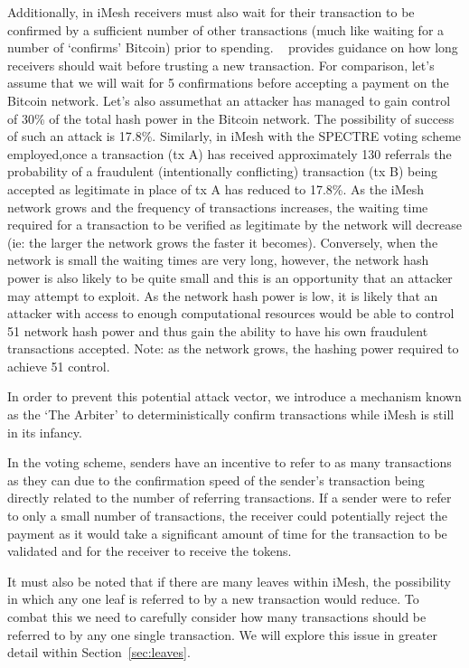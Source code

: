 \documentclass[a4paper,10pt,twocolumn]{article}
\begin{document}
 Additionally, in iMesh receivers must also wait for their transaction to be confirmed by a sufficient number of other transactions 
 (much like waiting for a number of `confirms' Bitcoin) prior to spending. ~\cite{spectre} provides guidance on how long receivers 
 should wait before trusting a new transaction. For comparison, let's assume that we will wait for 5 confirmations before accepting a 
 payment on the Bitcoin network. Let's also assumethat an attacker has managed to gain control of 30\% of the total hash power in the 
 Bitcoin network. The possibility of success of such an attack is 17.8\%\cite{btc}. Similarly, in iMesh with the SPECTRE voting scheme 
 employed,once a transaction (tx A) has received approximately 130 referrals the probability of a fraudulent (intentionally conflicting) 
 transaction (tx B) being accepted as legitimate in place of tx A has reduced to 17.8\%. As the iMesh network grows and the frequency of 
 transactions increases, the waiting time required for a transaction to be verified as legitimate by the network will decrease (ie: the 
 larger the network grows the faster it becomes). Conversely, when the network is small the waiting times are very long, however, the 
 network hash power is also likely to be quite small and this is an opportunity that an attacker may attempt to exploit. As the network 
 hash power is low, it is likely that an attacker with access to enough computational resources would be able to control 51%
 network hash power and thus gain the ability to have his own fraudulent transactions accepted. Note: as the network grows, the hashing 
 power required to achieve 51%
 control.
 
In order to prevent this potential attack vector, we introduce a mechanism known as the `The Arbiter' to deterministically confirm transactions while iMesh is still in its infancy.

In the voting scheme, senders have an incentive to refer to as many transactions as they can due to the confirmation speed of the 
sender's transaction being directly related to the number of referring transactions. If a sender were to refer to only a small number of 
transactions, the receiver could potentially reject the payment as it would take a significant amount of time for the transaction to be 
validated and for the receiver to receive the tokens.

It must also be noted that if there are many leaves within iMesh, the possibility in which any one leaf is referred to by a new 
transaction would reduce. To combat this we need to carefully consider how many transactions should be referred to by any one single 
transaction. We will explore this issue in greater detail within Section~\ref{sec:leaves}.
\end{document}

